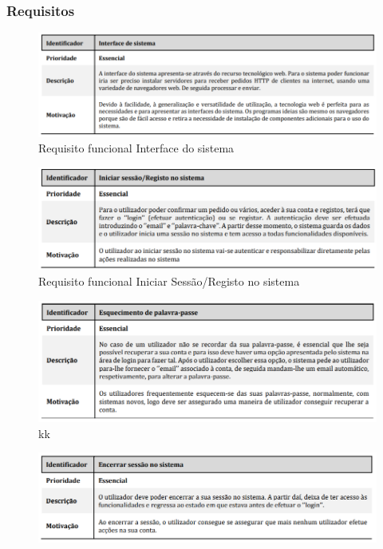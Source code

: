 \subsubsection{Requisitos}
\begin{figure}[h]
	\centering
	\includegraphics{requisito_funcional1}
	\caption{Requisito funcional Interface do sistema}
	\label{fig:requisitofuncional1}
\end{figure}

\begin{figure}[h]
	\centering
	\includegraphics{requisito_funcional2}
	\caption{Requisito funcional Iniciar Sessão/Registo no sistema}
	\label{fig:requisitofuncional2}
\end{figure}

\begin{figure}[h]
	\centering
	\includegraphics{requisito_funcional3}
	\caption{kk}
	\label{fig:requisitofuncional3}
\end{figure}

\begin{figure}[h]
	\centering
	\includegraphics{requisito_funcional4}
	\caption{}
	\label{fig:requisitofuncional4}
\end{figure}


